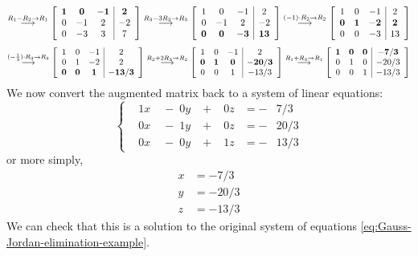 \documentclass[10pt]{article}
\newenvironment{augmentedmatrix}[1] %
{\left[\begin{array}{#1}}
    {\end{array}\right]}
\theoremstyle{definition}
\begin{document}
\begin{equation*}
  \overset{R_{1}-R_{2} \to R_{1}}{\longrightarrow}
  \begin{augmentedmatrix}{ccc|c}
    \mathbf{1}& \mathbf{0}& \mathbf{-1}& \mathbf{2} \\
    0& -1& 2& -2 \\
    0& -3& 3& 7
  \end{augmentedmatrix}
  \overset{R_{3}-3R_{2} \to R_{3}}{\longrightarrow}
  \begin{augmentedmatrix}{ccc|c}
    1& 0& -1& 2 \\
    0& -1& 2& -2 \\
    \mathbf{0}& \mathbf{0}& \mathbf{-3}& \mathbf{13}
  \end{augmentedmatrix}
  \overset{(-1)\cdot R_{2} \to R_{2}}{\longrightarrow}
  \begin{augmentedmatrix}{ccc|c}
    1& 0& -1& 2 \\
    \mathbf{0}& \mathbf{1}& \mathbf{-2}& \mathbf{2} \\
    0& 0& -3& 13
  \end{augmentedmatrix}
\end{equation*}
\begin{equation*}
  \overset{(-\frac{1}{3})\cdot R_{3} \to R_{3}}{\longrightarrow}
  \begin{augmentedmatrix}{ccc|c}
    1& 0& -1& 2 \\
    0& 1& -2& 2 \\
    \mathbf{0}& \mathbf{0}& \mathbf{1}& \mathbf{-13/3}
  \end{augmentedmatrix}
  \overset{R_{2}+2R_{3} \to R_{2}}{\longrightarrow}
  \begin{augmentedmatrix}{ccc|c}
    1& 0& -1& 2 \\
    \mathbf{0}& \mathbf{1}& \mathbf{0}& \mathbf{-20/3} \\
    0& 0& 1& -13/3
  \end{augmentedmatrix}
  \overset{R_{1}+R_{3} \to R_{1}}{\longrightarrow}
  \begin{augmentedmatrix}{ccc|c}
    \mathbf{1}& \mathbf{0}& \mathbf{0}& \mathbf{-7/3} \\
    0& 1& 0& -20/3 \\
    0& 0& 1& -13/3
  \end{augmentedmatrix}
\end{equation*}
We now convert the augmented matrix back to a system of linear equations:
\begin{equation*}
  \left\{
    \begin{alignedat}{4}
      &1x &{}\;-\; 0y &{}\;+\; &0z{}&= -&7/3 \\
      &0x&{}\;-\; 1y&{}\;+\; &0z{}&= -&20/3 \\
      &0x&{}\;-\; 0y&{}\;+\; &1z {}&= -&13/3
    \end{alignedat}
  \right.
\end{equation*}
or more simply,
\begin{align*}
  x &= -7/3\\
  y &= -20/3\\
  z &= -13/3
\end{align*}
We can check that this is a solution to the original system of equations
\eqref{eq:Gauss-Jordan-elimination-example}.
\end{document}
